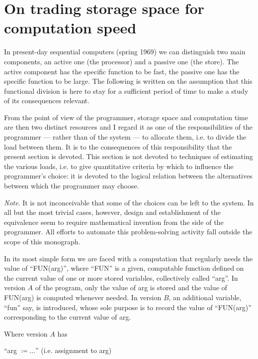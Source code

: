 \section{On trading storage space for computation speed}
\label{sec:trading-storage-for-computation-speed}

In present-day sequential computers (spring 1969) we can distinguish two main components, an active one (the processor) and a passive one (the store). The active component has the specific function to be fast, the passive one has the specific function to be large. The following is written on the assumption that this functional division is here to stay for a sufficient period of time to make a study of its consequences relevant.

From the point of view of the programmer, storage space and computation time are then two distinct resources and I regard it as one of the responsibilities of the programmer --- rather than of the system --- to allocate them, i.e. to divide the load between them. It is to the consequences of this responsibility that the present section is devoted. This section is not devoted to techniques of estimating the various loads, i.e. to give quantitative criteria by which to influence the programmer's choice: it is devoted to the logical relation between the alternatives between which the programmer may choose.

\noindent
\textit{Note}. It is not inconceivable that some of the choices can be left to the system. In all but the most trivial cases, however, design and establishment of the equivalence seem to require mathematical invention from the side of the programmer. All efforts to automate this problem-solving activity fall outside the scope of this monograph.

In its most simple form we are faced with a computation that regularly needs the value of ``FUN(arg)'', where ``FUN'' is a given, computable function defined on the current value of one or more stored variables, collectively called ``arg''. In version $A$ of the program, only the value of arg is stored and the value of FUN(arg) is computed whenever needed. In version $B$, an additional variable, ``fun'' say, is introduced, whose sole purpose is to record the value of ``FUN(arg)'' corresponding to the current value of arg.

Where version $A$ has
\medskip

{
	\setlength{\parindent}{8em}
	\hspace{-.4em}``arg $\coloneq \dots$'' (i.e. assignment to arg)
	
}
\medskip

